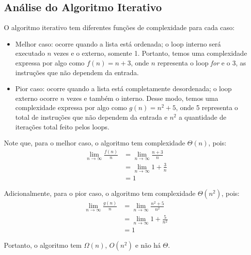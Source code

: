 \subsection{Análise do Algoritmo Iterativo}
O algoritmo iterativo tem diferentes funções de complexidade para cada caso:
\begin{itemize}
  \item Melhor caso: ocorre quando a lista está ordenada; o loop interno será executado $n$ vezes e o externo, somente 1. Portanto, temos uma complexidade expressa por algo como $f(n) = n + 3$, onde $n$ representa o loop \textit{for} e o 3, as instruções que não dependem da entrada.
  \item Pior caso: ocorre quando a lista está completamente desordenada; o loop externo ocorre $n$ vezes e também o interno. Desse modo, temos uma complexidade expressa por algo como $g(n) = n^2 + 5$, onde 5 representa o total de instruções que não dependem da entrada e $n^2$ a quantidade de iterações total feito pelos loops.
\end{itemize}

Note que, para o melhor caso, o algoritmo tem complexidade $\Theta(n)$, pois:
\begin{align*}
    \lim_{n\to\infty} \frac{f(n)}{n} &= \lim_{n\to\infty} \frac{n + 3}{n} \\
    &= \lim_{n\to\infty} 1 + \frac{3}{n} \\ 
    &= 1 
\end{align*}

Adicionalmente, para o pior caso, o algoritmo tem complexidade $\Theta(n^2)$, pois:
\begin{align*}
    \lim_{n\to\infty} \frac{g(n)}{n} &= \lim_{n\to\infty} \frac{n^2 + 5}{n^2} \\
    &= \lim_{n\to\infty} 1 + \frac{5}{n^2} \\ 
    &= 1 
\end{align*}

Portanto, o algoritmo tem $\Omega(n)$, $O(n^2)$ e não há $\Theta$.
